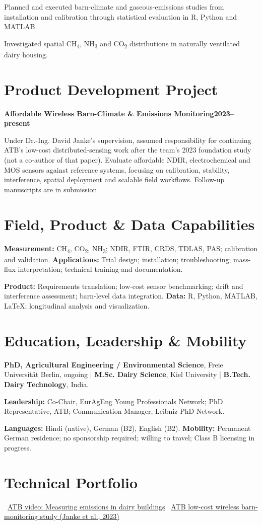 \documentclass[10pt,a4paper]{article}
\begin{document}
\begin{compactitems}
  \item Planned and executed barn-climate and gaseous-emissions studies from installation and calibration through statistical evaluation in R, Python and MATLAB.
  \item Investigated spatial CH\textsubscript{4}, NH\textsubscript{3} and CO\textsubscript{2} distributions in naturally ventilated dairy housing.
\end{compactitems}

\section*{Product Development Project}
\textbf{Affordable Wireless Barn-Climate \& Emissions Monitoring}\hfill{\brandfont\bfseries\color{fieldgreen}2023--present}\par
Under Dr.-Ing. David Janke's supervision, assumed responsibility for continuing ATB's low-cost distributed-sensing work after the team's 2023 foundation study (not a co-author of that paper). Evaluate affordable NDIR, electrochemical and MOS sensors against reference systems, focusing on calibration, stability, interference, spatial deployment and scalable field workflows. Follow-up manuscripts are in submission.

\section*{Field, Product \& Data Capabilities}
\textbf{Measurement:} CH\textsubscript{4}, CO\textsubscript{2}, NH\textsubscript{3}; NDIR, FTIR, CRDS, TDLAS, PAS; calibration and validation. \quad
\textbf{Applications:} Trial design; installation; troubleshooting; mass-flux interpretation; technical training and documentation.\par
\textbf{Product:} Requirements translation; low-cost sensor benchmarking; drift and interference assessment; barn-level data integration. \quad
\textbf{Data:} R, Python, MATLAB, LaTeX; longitudinal analysis and visualization.

\section*{Education, Leadership \& Mobility}
\textbf{PhD, Agricultural Engineering / Environmental Science}, Freie Universität Berlin, ongoing \enspace|\enspace
\textbf{M.Sc. Dairy Science}, Kiel University \enspace|\enspace
\textbf{B.Tech. Dairy Technology}, India.\par
\textbf{Leadership:} Co-Chair, EurAgEng Young Professionals Network; PhD Representative, ATB; Communication Manager, Leibniz PhD Network.\par
\textbf{Languages:} Hindi (native), German (B2), English (B2). \quad
\textbf{Mobility:} Permanent German residence; no sponsorship required; willing to travel; Class B licensing in progress.

\section*{Technical Portfolio}
\portfolioicon\ \href{https://youtu.be/41Y6egqsQDI}{ATB video: Measuring emissions in dairy buildings}\hfill
\portfolioicon\ \href{https://www.mdpi.com/2073-4433/14/11/1643}{ATB low-cost wireless barn-monitoring study (Janke et al., 2023)}
\end{document}
